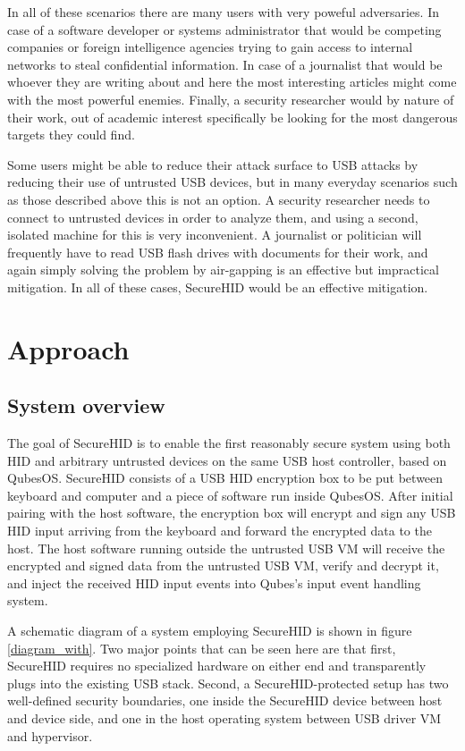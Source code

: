 \documentclass[12pt,a4paper,notitlepage]{article}
\begin{document}
In all of these scenarios there are many users with very poweful adversaries. In case of a software developer or systems
administrator that would be competing companies or foreign intelligence agencies trying to gain access to internal
networks to steal confidential information. In case of a journalist that would be whoever they are writing about and
here the most interesting articles might come with the most powerful enemies. Finally, a security researcher would by
nature of their work, out of academic interest specifically be looking for the most dangerous targets they could find.

Some users might be able to reduce their attack surface to USB attacks by reducing their use of untrusted USB devices,
but in many everyday scenarios such as those described above this is not an option. A security researcher needs to
connect to untrusted devices in order to analyze them, and using a second, isolated machine for this is very
inconvenient. A journalist or politician will frequently have to read USB flash drives with documents for their work,
and again simply solving the problem by air-gapping is an effective but impractical mitigation. In all of these cases,
SecureHID would be an effective mitigation.

\section{Approach}
\subsection{System overview}
The goal of SecureHID is to enable the first reasonably secure system using both HID and arbitrary untrusted devices on
the same USB host controller, based on QubesOS. SecureHID consists of a USB HID encryption box to be put between
keyboard and computer and a piece of software run inside QubesOS. After initial pairing with the host software, the
encryption box will encrypt and sign any USB HID input arriving from the keyboard and forward the encrypted data to the
host. The host software running outside the untrusted USB VM will receive the encrypted and signed data from the
untrusted USB VM, verify and decrypt it, and inject the received HID input events into Qubes's input event handling
system.

A schematic diagram of a system employing SecureHID is shown in figure \ref{diagram_with}. Two major points that can be
seen here are that first, SecureHID requires no specialized hardware on either end and transparently plugs into the
existing USB stack. Second, a SecureHID-protected setup has two well-defined security boundaries, one inside the
SecureHID device between host and device side, and one in the host operating system between USB driver VM and
hypervisor.
\end{document}
